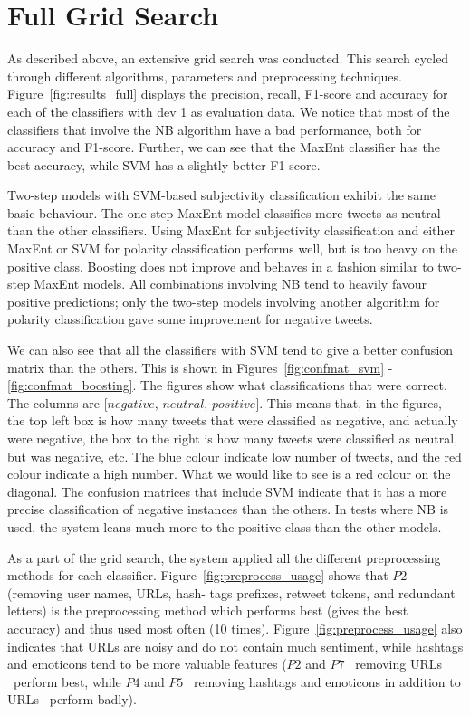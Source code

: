 \section{Full Grid Search}

As described above, an extensive grid search was conducted. This search cycled through different algorithms, parameters and preprocessing techniques. Figure~\ref{fig:results_full} displays the precision, recall, F1-score and accuracy for each of the classifiers with dev 1 as evaluation data. We notice that most of the classifiers that involve the NB algorithm have a bad performance, both for accuracy and F1-score. Further, we can see that the MaxEnt classifier has the best accuracy, while SVM has a slightly better F1-score.

Two-step models with SVM-based subjectivity classification exhibit the same basic behaviour. The one-step MaxEnt model classifies more tweets as neutral than the other classifiers. Using MaxEnt for subjectivity classification and either MaxEnt or SVM for polarity classification performs well, but is too heavy on the positive class. Boosting does not improve and behaves in a fashion similar to two-step MaxEnt models. All combinations involving NB tend to heavily favour positive predictions; only the two-step models involving another algorithm for polarity classification gave some improvement for negative tweets.

We can also see that all the classifiers with SVM tend to give a better confusion matrix than the others. This is shown in Figures~\ref{fig:confmat_svm} - \ref{fig:confmat_boosting}. The figures show what classifications that were correct. The columns are [$negative$, $neutral$, $positive$]. This means that, in the figures, the top left box is how many tweets that were classified as negative, and actually were negative, the box to the right is how many tweets were classified as neutral, but was negative, etc. The blue colour indicate low number of tweets, and the red colour indicate a high number. What we would like to see is a red colour on the diagonal. The confusion matrices that include SVM indicate that it has a more precise classification of negative instances than the others. In tests where NB is used, the system leans much more to the positive class than the other models.

As a part of the grid search, the system applied all the different preprocessing methods for each classifier. Figure~\ref{fig:preprocess_usage} shows that $P2$ (removing user names, URLs, hash- tags prefixes, retweet tokens, and redundant letters) is the preprocessing method which performs best (gives the best accuracy) and thus used most often (10 times). Figure~\ref{fig:preprocess_usage} also indicates that URLs are noisy and do not contain much sentiment, while hashtags and emoticons tend to be more valuable features ($P2$ and $P7$ \textemdash~removing URLs \textemdash~perform best, while $P4$ and $P5$ \textemdash~removing hashtags and emoticons in addition to URLs \textemdash~perform badly).

